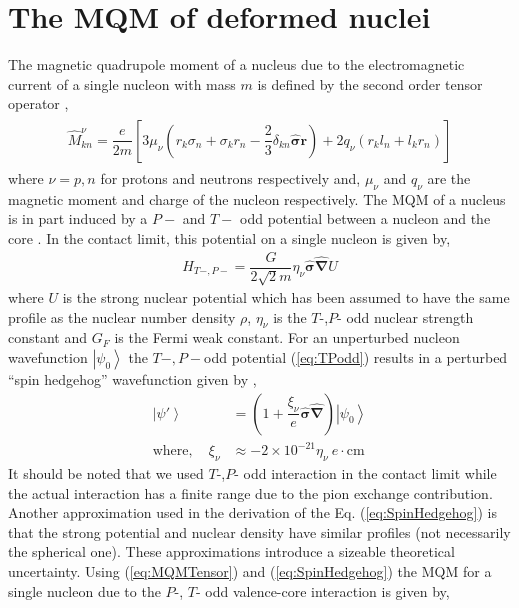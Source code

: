 \documentclass[10pt,a4paper, twoside, openright]{report}
\begin{document}
\section{The MQM of deformed nuclei}
The magnetic quadrupole moment of a nucleus due to the electromagnetic current of a single nucleon with mass $m$ is defined by the second order tensor operator \cite{SFK1984},
\begin{align} \label{eq:MQMTensor}
\begin{split}
\hat{M}_{kn}^{\nu} = \dfrac{e}{2m}\left[3\mu_{\nu}\left(r_k\sigma_n + \sigma_kr_n - \dfrac{2}{3}\delta_{kn}\hat{\boldsymbol{\sigma}}\textbf{r}\right) + 2q_{\nu}\left(r_kl_n + l_kr_n\right)\right]
\end{split}
\end{align}
where $\nu = p,n$ for protons and neutrons respectively and, $\mu_{\nu}$ and $q_{\nu}$ are the magnetic moment and charge of the nucleon respectively. The MQM of a nucleus is in part induced by a $P-$ and $T-$ odd potential between a nucleon and the core \cite{Flambaum1994, SFK1984, KhriplovichPNC}. In the contact limit, this potential on a single nucleon is given by, 
\begin{align} \label{eq:TPodd}
H_{T-,P-} = \dfrac{G}{2\sqrt{2}m}\eta_{\nu}\hat{\boldsymbol{\sigma}}\hat{\boldsymbol{\nabla}}U
\end{align}
where $U$ is the strong nuclear potential which has been assumed to have the same profile as the nuclear number density $\rho$, $\eta_{\nu}$ is the $T$-,$P$- odd nuclear strength constant and $G_{F}$ is the Fermi weak constant. For an unperturbed nucleon wavefunction $\left|\psi_0\right>$ the  $T-,P-$odd potential (\ref{eq:TPodd}) results in a perturbed ``spin hedgehog'' wavefunction given by \cite{SFK1984, Flambaum1994},
\begin{align} \label{eq:SpinHedgehog}
\left|\psi'\right> &= \left(1 + \dfrac{\xi_{\nu}}{e}\hat{\boldsymbol{\sigma}}\hat{\boldsymbol{\nabla}}\right)\left|\psi_0\right> \\
\text{where}, \quad \xi_{\nu} &\approx -2\times 10^{-21}\eta_{\nu} \ e\cdot\text{cm} \nonumber
\end{align}
It should be noted that we used   $T$-,$P$- odd interaction in the contact limit while the actual interaction has a finite range due to the pion exchange contribution. Another approximation used in the derivation of the Eq. (\ref{eq:SpinHedgehog}) is that the strong potential and nuclear density have similar profiles (not necessarily the  spherical one). These approximations introduce a sizeable theoretical uncertainty.  Using (\ref{eq:MQMTensor}) and (\ref{eq:SpinHedgehog}) the MQM for a single nucleon due to the $P$-, $T$- odd valence-core interaction is given by,
\end{document}
